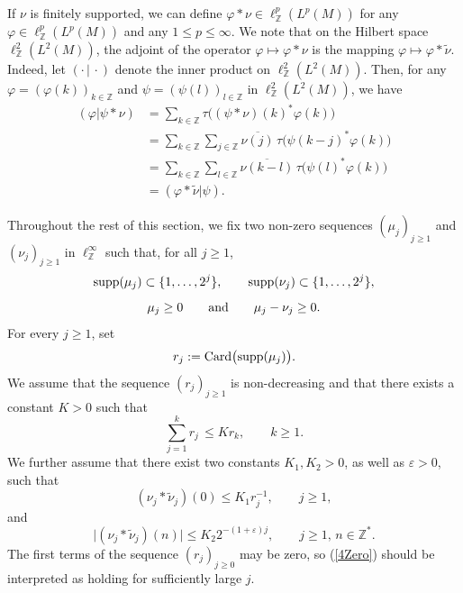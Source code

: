 \documentclass[12pt]{amsart}
\newcommand{\Zdb}{\mbox{$\mathbb{Z}$}}
\theoremstyle{remark}
\theoremstyle{definition}
\numberwithin{equation}{section}
\begin{document}
If $\nu$ is finitely supported, we can define
$\varphi *\nu \in \ell^p_{\mathbb Z}(L^p(M))$ for any
$\varphi\in\ell^p_{\mathbb Z}(L^p(M))$
and any $1\leq p\leq \infty$.
We note that on the Hilbert space $\ell^2_{\mathbb Z}(L^2(M))$,
the adjoint of the operator $\varphi\mapsto \varphi *\nu$ is the mapping
$\varphi\mapsto \varphi * \widetilde{\nu}$.
Indeed, let $(\cdotp\,\vert\,\cdotp)$ denote the inner product on
$\ell^2_{\mathbb Z}(L^2(M))$. Then,
for any $\varphi=(\varphi(k))_{k\in\mathbb Z}$
and $\psi=(\psi(l))_{l\in\mathbb Z}$ in $\ell^2_{\mathbb Z}(L^2(M))$,
we have
\begin{align}\label{4Adjoint}
(\varphi \vert \psi *\nu) & = \sum_{k\in\mathbb Z}\tau\bigl((\psi*\nu)(k)^* \varphi(k)\bigr)\\ \nonumber
& = \sum_{k\in\mathbb Z}
\sum_{j\in\mathbb Z}\overline{\nu(j)}\,
\tau\bigl(\psi(k-j)^* \varphi(k)\bigr)\\ \nonumber
& = \sum_{k\in\mathbb Z}\sum_{l\in\mathbb Z}
\overline{\nu(k-l)}\,\tau\bigl(\psi(l)^* \varphi(k)\bigr)\\ \nonumber
& = (\varphi*\widetilde{\nu}\vert \psi). \nonumber
\end{align}

Throughout the rest of this section, we fix two non-zero
sequences $(\mu_j)_{j\geq 1}$
and $(\nu_j)_{j\geq 1}$
in $\ell^\infty_{\mathbb Z}$ such that, for all
$j\geq 1$,
\begin{equation}\label{4Support}
{\rm supp}(\mu_j)\subset \{1,\ldots, 2^j\},
\qquad
{\rm supp}(\nu_j)\subset \{1,\ldots, 2^j\},
\end{equation}
\begin{equation}\label{4Positive}
\mu_j\geq 0\qquad\hbox{and}\qquad
\mu_j-\nu_j\geq 0.
\end{equation}
For every $j\geq 1$, set
$$
r_j := {\rm Card}\bigl({\rm supp}(\mu_j)\bigr).
$$
We assume that the sequence $(r_j)_{j\geq 1}$ is non-decreasing
and that there exists a constant $K>0$ such that
\begin{equation}\label{4Domination}
\sum_{j=1}^k r_j\,\leq K r_k,\qquad k\geq 1.
\end{equation}
We further assume
that there exist two constants $K_1,K_2>0$, as well as
$\varepsilon>0$, such that
\begin{equation}\label{4Zero}
(\nu_j * \widetilde{\nu}_j)(0)\leq K_1 r_{j}^{-1},\qquad j\geq 1,
\end{equation}
and
\begin{equation}\label{4NonZero}
\bigl\vert (\nu_j * \widetilde{\nu}_j)(n)\bigr\vert\leq K_2 2^{-(1+\varepsilon)j},
\qquad j\geq 1, \, n\in\Zdb^*.
\end{equation}
The first terms of the sequence $(r_j)_{j\geq 0}$ may be zero, so
(\ref{4Zero}) should be interpreted as holding for sufficiently large $j$.
\end{document}
